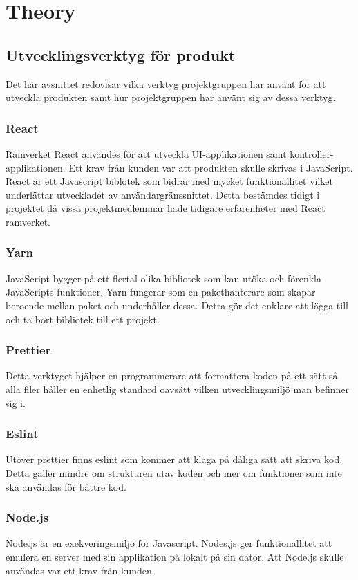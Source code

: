 \chapter{Theory}
\label{cha:theory}

\section{Utvecklingsverktyg för produkt}
Det här avsnittet redovisar vilka verktyg projektgruppen har använt för att utveckla produkten samt hur projektgruppen har använt sig av dessa verktyg.

\subsection*{React}
Ramverket React användes för att utveckla UI-applikationen samt kontroller-applikationen. Ett krav från kunden var att produkten skulle skrivas i JavaScript. React är ett Javascript biblotek som bidrar med mycket funktionallitet vilket underlättar utveckladet av användargränssnittet.  Detta bestämdes tidigt i projektet då vissa projektmedlemmar hade tidigare erfarenheter med React ramverket.

\subsection*{Yarn}
JavaScript bygger på ett flertal olika bibliotek som kan utöka och förenkla JavaScripts funktioner. Yarn fungerar som en pakethanterare som skapar beroende mellan paket och underhåller dessa. Detta gör det enklare att lägga till och ta bort bibliotek till ett projekt.

\subsection*{Prettier}
Detta verktyget hjälper en programmerare att formattera koden på ett sätt så alla filer håller en enhetlig standard oavsätt vilken utvecklingsmiljö man befinner sig i.

\subsection*{Eslint}
Utöver prettier finns eslint som kommer att klaga på dåliga sätt att skriva kod. Detta gäller mindre om strukturen utav koden och mer om funktioner som inte ska användas för bättre kod.

\subsection*{Node.js}
Node.js är en exekveringsmiljö för Javascript. Nodes.js ger funktionallitet att emulera en server med sin applikation på lokalt på sin dator. Att Node.js skulle användas var ett krav från kunden.
